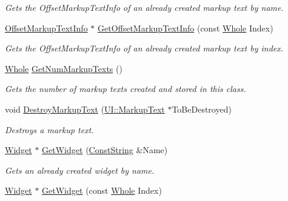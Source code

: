 \begin{DoxyCompactItemize}
\begin{DoxyCompactList}\small\item\em Gets the OffsetMarkupTextInfo of an already created markup text by name. \item\end{DoxyCompactList}\item 
\hyperlink{structphys_1_1UI_1_1ResizingInfo}{OffsetMarkupTextInfo} $\ast$ \hyperlink{classphys_1_1UI_1_1Window_ac4f6c031c334a3165e098e7e3546bb33}{GetOffsetMarkupTextInfo} (const \hyperlink{namespacephys_a460f6bc24c8dd347b05e0366ae34f34a}{Whole} Index)
\begin{DoxyCompactList}\small\item\em Gets the OffsetMarkupTextInfo of an already created markup text by index. \item\end{DoxyCompactList}\item 
\hyperlink{namespacephys_a460f6bc24c8dd347b05e0366ae34f34a}{Whole} \hyperlink{classphys_1_1UI_1_1Window_ac9e23e41ffff8ef475fcdb0c25bad240}{GetNumMarkupTexts} ()
\begin{DoxyCompactList}\small\item\em Gets the number of markup texts created and stored in this class. \item\end{DoxyCompactList}\item 
void \hyperlink{classphys_1_1UI_1_1Window_aba2506738c7cccfbf8297bf03e431cb8}{DestroyMarkupText} (\hyperlink{classphys_1_1UI_1_1MarkupText}{UI::MarkupText} $\ast$ToBeDestroyed)
\begin{DoxyCompactList}\small\item\em Destroys a markup text. \item\end{DoxyCompactList}\item 
\hyperlink{classphys_1_1UI_1_1Widget}{Widget} $\ast$ \hyperlink{classphys_1_1UI_1_1Window_a0d2274afdabda9915d242dc3d057ae61}{GetWidget} (\hyperlink{namespacephys_a5ce5049f8b4bf88d6413c47b504ebb31}{ConstString} \&Name)
\begin{DoxyCompactList}\small\item\em Gets an already created widget by name. \item\end{DoxyCompactList}\item 
\hyperlink{classphys_1_1UI_1_1Widget}{Widget} $\ast$ \hyperlink{classphys_1_1UI_1_1Window_aaae8adbb33e9bd13aca4eec49ec978c9}{GetWidget} (const \hyperlink{namespacephys_a460f6bc24c8dd347b05e0366ae34f34a}{Whole} Index)

\end{DoxyCompactItemize}
